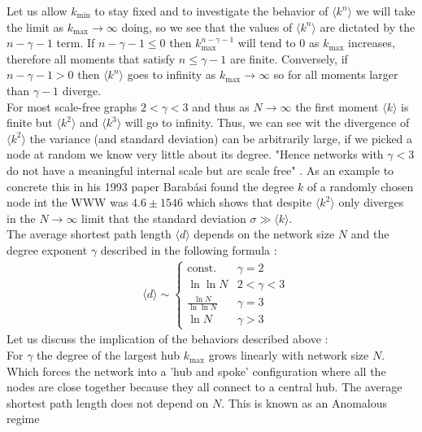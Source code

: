 \documentclass{article}
\begin{document}
        Let us allow $k_{\text{min}}$ to stay fixed and to investigate the behavior of $\langle k^n \rangle$ we will take the limit as $k_\text{max} \to \infty$ doing, so we see that the values of $\langle k^n \rangle$ are dictated by the $n-\gamma -1$ term. If $n-\gamma -1 \leqslant 0$ then $k^{n-\gamma -1}_{\text{max}}$ will tend to $0$ as $k_\text{max}$ increases, therefore all moments that satisfy $n\leqslant \gamma-1$ are finite. Conversely, if  $n-\gamma -1 > 0$  then $\langle k^n \rangle$ goes to infinity as $k_\text{max} \to \infty$ so for all moments larger than $\gamma-1$ diverge.\\ 
        For most scale-free graphs $2<\gamma<3$ and thus as $N\to \infty$ the first moment $\langle k \rangle$ is finite but $\langle k^2 \rangle$ and $\langle k^3 \rangle$ will go to infinity. Thus, we can see wit the divergence of $\langle k^2 \rangle$ the variance (and standard deviation) can be arbitrarily large, if we picked a node at random we know very little about its degree. "Hence networks with $\gamma<3$ do not have a meaningful internal scale but are scale free" \parencite{barabasi2013network}. As an example to concrete this in his 1993 paper Barabási found the degree $k$ of a randomly chosen node int the WWW was $4.6 \pm 1546$ which shows that despite $\langle k^2 \rangle$ only diverges in the $N \to \infty$ limit that the standard deviation $\sigma \gg  \langle k \rangle$.\\
        The average shortest path length $\langle d \rangle$ depends on the network size $N$ and the degree exponent $\gamma$ described in the following formula \parencite{bollobas2004diameter}\parencite{cohen2003scale}:\\
        \begin{align*}
            &\langle d \rangle \sim
            \begin{cases}
                \text{const.} &\gamma =2\\
                \ln\ln N  &2<\gamma<3\\
                \frac{\ln N}{\ln\ln N}  &\gamma = 3\\
                \ln N  &\gamma>3
            \end{cases}
        \end{align*}
        Let us discuss the implication of the behaviors described above \parencite{barabasi2013network}:\\
        For $\gamma$ the degree of the largest hub $k_{\text{max}}$ grows linearly with network size $N$. Which forces the network into a 'hub and spoke' configuration where all the nodes are close together because they all connect to a central hub. The average shortest path length does not depend on $N$. This is known as an Anomalous regime\\
\end{document}
